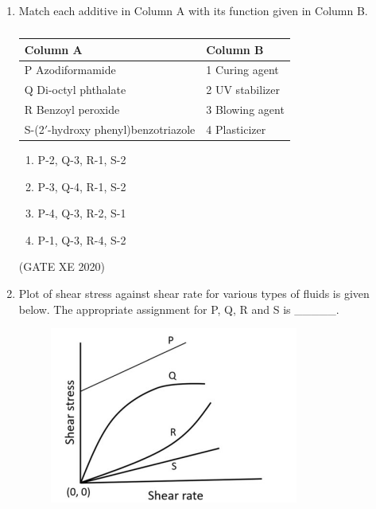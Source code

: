 \documentclass[12pt]{article}
\begin{document}
\begin{enumerate}
\begin{enumerate}
\item P-2, Q-3, R-4, S-1  
\item P-3, Q-4, R-1, S-2  
\item P-2, Q-4, R-1, S-3  
\item P-4, Q-1, R-3, S-2  
\end{enumerate}

(GATE XE 2020)

\item Match each additive in Column A with its function given in Column B.

\begin{table}[H]
\centering
\caption{} \label{}
\begin{tabular}{|l|l|}
\hline
\textbf{Column A} & \textbf{Column B} \\ \hline
P\; Azodiformamide             & 1\; Curing agent \\ \hline
Q\; Di-octyl phthalate         & 2\; UV stabilizer \\ \hline
R\; Benzoyl peroxide           & 3\; Blowing agent \\ \hline
S\; 2-(2$'$-hydroxy phenyl)benzotriazole & 4\; Plasticizer \\ \hline
\end{tabular}
\end{table}

\begin{enumerate}
\item P-2, Q-3, R-1, S-2  
\item P-3, Q-4, R-1, S-2  
\item P-4, Q-3, R-2, S-1  
\item P-1, Q-3, R-4, S-2  
\end{enumerate}

(GATE XE 2020)

\item Plot of shear stress against shear rate for various types of fluids is given below.  
The appropriate assignment for P, Q, R and S is \_\_\_\_\_.  

\begin{figure}[H]
    \centering
    \includegraphics[width=0.5\columnwidth]{figs/ass4_f_q14.png}
    \caption{}
    \label{fig:placeholder}
\end{figure}


\end{enumerate}
\end{document}
